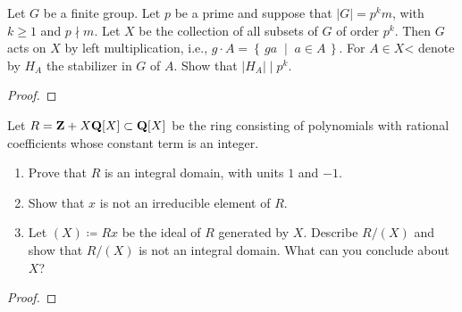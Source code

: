 \begin{problem}
Let $G$ be a finite group. Let $p$ be a prime and suppose that $|G|=p^km$,
with $k\geq 1$ and $p\nmid m$. Let $X$ be the collection of all subsets of
$G$ of order $p^k$. Then $G$ acts on $X$ by left multiplication, i.e.,
$g\cdot A=\left\{\,ga\;\middle|\;a\in A\,\right\}$. For $A\in X$< denote by
$H_A$ the stabilizer in $G$ of $A$. Show that $|H_A|\mid p^k$.
\end{problem}
\begin{proof}
\end{proof}

\begin{problem}
Let $R=\mathbf{Z}+X\mathbf{Q}[X]\subset\mathbf{Q}[X]$ be the ring consisting of polynomials
with rational coefficients whose constant term is an integer.
\begin{enumerate}[label=(\alph*)]
\item Prove that $R$ is an integral domain, with units $1$ and $-1$.
\item Show that $x$ is not an irreducible element of $R$.
\item Let $(X)\coloneqq Rx$ be the ideal of $R$ generated by $X$. Describe
  $R/(X)$ and show that $R/(X)$ is not an integral domain. What can you
  conclude about $X$?
\end{enumerate}
\end{problem}
\begin{proof}
\end{proof}

